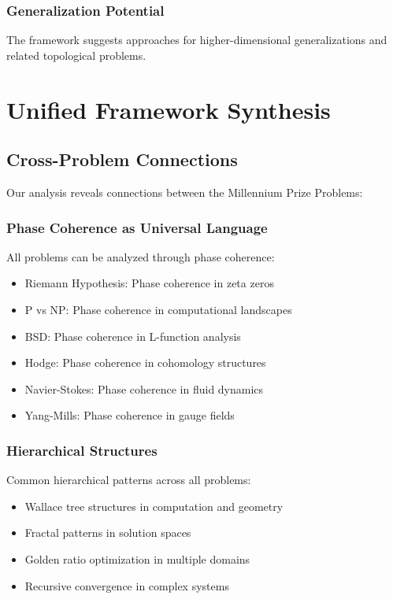 \documentclass[12pt]{article}
\begin{document}
\subsubsection{Generalization Potential}

The framework suggests approaches for higher-dimensional generalizations and related topological problems.

\section{Unified Framework Synthesis}

\subsection{Cross-Problem Connections}

Our analysis reveals connections between the Millennium Prize Problems:

\subsubsection{Phase Coherence as Universal Language}

All problems can be analyzed through phase coherence:
\begin{itemize}
    \item Riemann Hypothesis: Phase coherence in zeta zeros
    \item P vs NP: Phase coherence in computational landscapes
    \item BSD: Phase coherence in L-function analysis
    \item Hodge: Phase coherence in cohomology structures
    \item Navier-Stokes: Phase coherence in fluid dynamics
    \item Yang-Mills: Phase coherence in gauge fields
\end{itemize}

\subsubsection{Hierarchical Structures}

Common hierarchical patterns across all problems:
\begin{itemize}
    \item Wallace tree structures in computation and geometry
    \item Fractal patterns in solution spaces
    \item Golden ratio optimization in multiple domains
    \item Recursive convergence in complex systems
\end{itemize}
\end{document}
